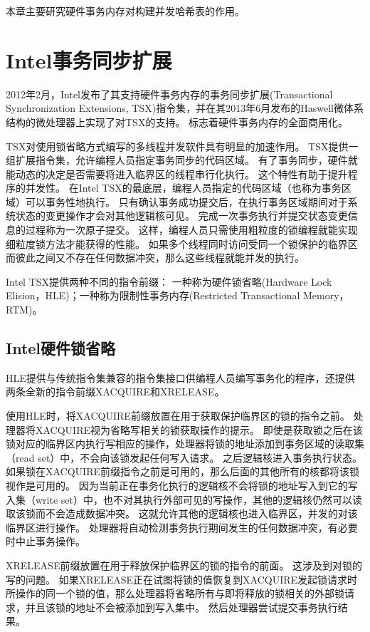 本章主要研究硬件事务内存对构建并发哈希表的作用。

\section{Intel事务同步扩展}
2012年2月，Intel发布了其支持硬件事务内存的事务同步扩展(Transactional Synchronization Extensions, TSX)指令集，并在其2013年6月发布的Haswell微体系结构的微处理器上实现了对TSX的支持。
标志着硬件事务内存的全面商用化。

TSX对使用锁省略方式编写的多线程并发软件具有明显的加速作用。 
TSX提供一组扩展指令集，允许编程人员指定事务同步的代码区域。
有了事务同步，硬件就能动态的决定是否需要将进入临界区的线程串行化执行。
这个特性有助于提升程序的并发性。
在Intel TSX的最底层，编程人员指定的代码区域（也称为事务区域）可以事务性地执行。
只有确认事务成功提交后，在执行事务区域期间对于系统状态的变更操作才会对其他逻辑核可见。
完成一次事务执行并提交状态变更信息的过程称为一次原子提交。
这样，编程人员只需使用粗粒度的锁编程就能实现细粒度锁方法才能获得的性能。
如果多个线程同时访问受同一个锁保护的临界区而彼此之间又不存在任何数据冲突，那么这些线程就能并发的执行。

Intel TSX提供两种不同的指令前缀：
一种称为硬件锁省略(Hardware Lock Elision，HLE)；一种称为限制性事务内存(Restricted Transactional Memory，RTM)。

\subsection{Intel硬件锁省略}
HLE提供与传统指令集兼容的指令集接口供编程人员编写事务化的程序，还提供两条全新的指令前缀XACQUIRE和XRELEASE。

使用HLE时，将XACQUIRE前缀放置在用于获取保护临界区的锁的指令之前。
处理器将XACQUIRE视为省略写相关的锁获取操作的提示。
即使是获取锁之后在该锁对应的临界区内执行写相应的操作，处理器将锁的地址添加到事务区域的读取集（read set）中，不会向该锁发起任何写入请求。
之后逻辑核进入事务执行状态。
如果锁在XACQUIRE前缀指令之前是可用的，那么后面的其他所有的核都将该锁视作是可用的。
因为当前正在事务化执行的逻辑核不会将锁的地址写入到它的写入集（write set）中，也不对其执行外部可见的写操作，其他的逻辑核仍然可以读取该锁而不会造成数据冲突。
这就允许其他的逻辑核也进入临界区，并发的对该临界区进行操作。
处理器将自动检测事务执行期间发生的任何数据冲突，有必要时中止事务操作。

XRELEASE前缀放置在用于释放保护临界区的锁的指令的前面。
这涉及到对锁的写的问题。
如果XRELEASE正在试图将锁的值恢复到XACQUIRE发起锁请求时所操作的同一个锁的值，那么处理器将省略所有与即将释放的锁相关的外部锁请求，并且该锁的地址不会被添加到写入集中。
然后处理器尝试提交事务执行结果。

